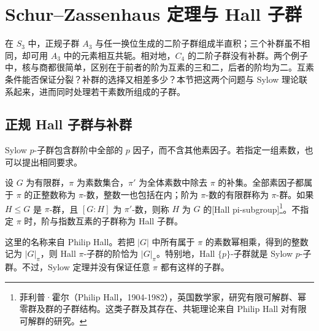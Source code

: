 
\section{Schur–Zassenhaus 定理与 Hall 子群}
\label{b1:sec:C06}

在 \(S_3\) 中，正规子群 \(A_3\) 与任一换位生成的二阶子群组成半直积；三个补群虽不相同，却可用 \(A_3\) 中的元素相互共轭。相对地，\(C_4\) 的二阶子群没有补群。两个例子中，核与商都很简单，区别在于前者的阶为互素的三和二，后者的阶均为二。互素条件能否保证分裂？补群的选择又相差多少？本节把这两个问题与 Sylow 理论联系起来，进而同时处理若干素数所组成的子群。

\subsection{正规 Hall 子群与补群}
\label{b1:subsec:C06:01}

Sylow \(p\)-子群包含群阶中全部的 \(p\) 因子，而不含其他素因子。若指定一组素数，也可以提出相同要求。

\begin{definition}\label{b1:def:C-hall-subgroup}
	设 \(G\) 为有限群，\(\pi\) 为素数集合，\(\pi'\) 为全体素数中除去 \(\pi\) 的补集。全部素因子都属于 \(\pi\) 的正整数称为 \(\pi\)-数，整数一也包括在内；阶为 \(\pi\)-数的有限群称为 \(\pi\)-群。如果 \(H\leq G\) 是 \(\pi\)-群，且 \([G:H]\) 为 \(\pi'\)-数，则称 \(H\) 为 \(G\) 的[Hall pi-subgroup]\footnote{菲利普·霍尔（Philip Hall，1904-1982），英国数学家，研究有限可解群、幂零群及群的子群结构。这类子群及其存在、共轭理论来自 Philip Hall 对有限可解群的研究。}。不指定 \(\pi\) 时，阶与指数互素的子群称为 Hall 子群。
\end{definition}

这里的名称来自 Philip Hall。若把 \(|G|\) 中所有属于 \(\pi\) 的素数幂相乘，得到的整数记为 \(|G|_\pi\)，则 Hall \(\pi\)-子群的阶恰为 \(|G|_\pi\)。特别地，Hall \(\{p\}\)-子群就是 Sylow \(p\)-子群。不过，Sylow 定理并没有保证任意 \(\pi\) 都有这样的子群。

